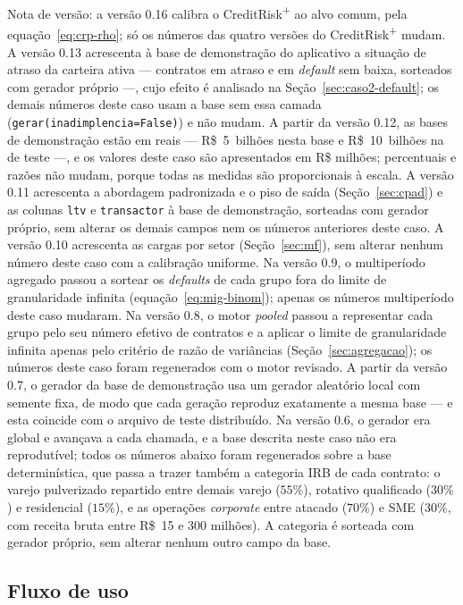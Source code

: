 \documentclass[11pt,a4paper]{article}
\begin{document}
Nota de versão: a versão 0.16 calibra o CreditRisk\textsuperscript{+} ao alvo comum, pela equação~\eqref{eq:crp-rho}; só os números das quatro versões do CreditRisk\textsuperscript{+} mudam. A versão 0.13 acrescenta à base de demonstração do aplicativo a situação de atraso da carteira ativa --- contratos em atraso e em \emph{default} sem baixa, sorteados com gerador próprio ---, cujo efeito é analisado na Seção~\ref{sec:caso2-default}; os demais números deste caso usam a base sem essa camada (\texttt{gerar(inadimplencia=False)}) e não mudam. A partir da versão 0.12, as bases de demonstração estão em reais --- R\$~5~bilhões nesta base e R\$~10~bilhões na de teste ---, e os valores deste caso são apresentados em R\$ milhões; percentuais e razões não mudam, porque todas as medidas são proporcionais à escala. A versão 0.11 acrescenta a abordagem padronizada e o piso de saída (Seção~\ref{sec:cpad}) e as colunas \texttt{ltv} e \texttt{transactor} à base de demonstração, sorteadas com gerador próprio, sem alterar os demais campos nem os números anteriores deste caso. A versão 0.10 acrescenta as cargas por setor (Seção~\ref{sec:mf}), sem alterar nenhum número deste caso com a calibração uniforme. Na versão 0.9, o multiperíodo agregado passou a sortear os \emph{defaults} de cada grupo fora do limite de granularidade infinita (equação~\eqref{eq:mig-binom}); apenas os números multiperíodo deste caso mudaram. Na versão 0.8, o motor \emph{pooled} passou a representar cada grupo pelo seu número efetivo de contratos e a aplicar o limite de granularidade infinita apenas pelo critério de razão de variâncias (Seção~\ref{sec:agregacao}); os números deste caso foram regenerados com o motor revisado. A partir da versão 0.7, o gerador da base de demonstração usa um gerador aleatório local com semente fixa, de modo que cada geração reproduz exatamente a mesma base --- e esta coincide com o arquivo de teste distribuído. Na versão 0.6, o gerador era global e avançava a cada chamada, e a base descrita neste caso não era reprodutível; todos os números abaixo foram regenerados sobre a base determinística, que passa a trazer também a categoria IRB de cada contrato: o varejo pulverizado repartido entre demais varejo ($55\%$), rotativo qualificado ($30\%$) e residencial ($15\%$), e as operações \emph{corporate} entre atacado ($70\%$) e SME ($30\%$, com receita bruta entre R\$~15 e 300 milhões). A categoria é sorteada com gerador próprio, sem alterar nenhum outro campo da base.

\subsection{Fluxo de uso}
\end{document}
